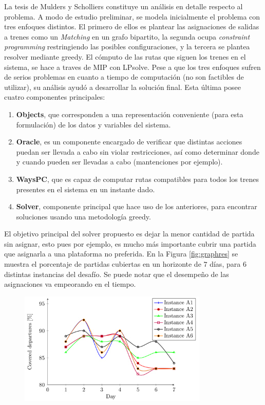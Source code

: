 \documentclass[letter, 10pt]{article}
\begin{document}
\begin{description}
    La tesis de Mulders y Scholliers \cite{Mulders} constituye un análisis en detalle respecto al problema. A modo de estudio preliminar, se modela inicialmente el problema con tres enfoques distintos. El primero de ellos es plantear las asignaciones de salidas a trenes como un \textit{Matching} en un grafo bipartito, la segunda ocupa \textit{constraint programming} restringiendo las posibles configuraciones, y la tercera se plantea resolver mediante greedy. El cómputo de las rutas que siguen los trenes en el sistema, se hace a traves de MIP con LPsolve. Pese a que los tres enfoques sufren de serios problemas en cuanto a tiempo de computación (no son factibles de utilizar), su análisis ayudó a desarrollar la solución final. Esta última posee cuatro componentes principales:
    \begin{enumerate}
        \item \textbf{Objects}, que corresponden a una representación conveniente (para esta formulación) de los datos y variables del sistema.
        \item \textbf{Oracle}, es un componente encargado de verificar que distintas acciones puedan ser llevada a cabo sin violar restricciones, así como determinar donde y cuando pueden ser llevadas a cabo (mantenciones por ejemplo).
        \item \textbf{WaysPC}, que es capaz de computar rutas compatibles para todos los trenes presentes en el sistema en un instante dado.
        \item \textbf{Solver}, componente principal que hace uso de los anteriores, para encontrar soluciones usando una metodología greedy.
    \end{enumerate}
    El objetivo principal del solver propuesto es dejar la menor cantidad de partida sin asignar, esto pues por ejemplo, es mucho más importante cubrir una partida que asignarla a una plataforma no preferida. En la Figura \ref{fig:graphres} se
    muestra el porcentaje de partidas cubiertas en un horizonte de $7$ días, para $6$ distintas instancias del desafío. Se puede notar que el desempeño de las asignaciones va empeorando en el tiempo.
    \begin{figure}[htpb!]
    \centering
    \includegraphics[width=9cm]{graphres}

\end{figure}
\end{description}
\end{document}
